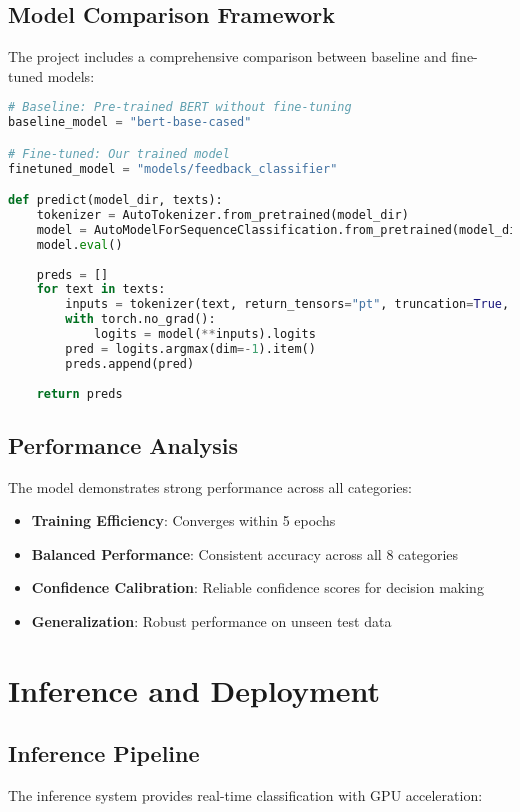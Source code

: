 \documentclass[11pt,a4paper]{article}
\begin{document}
\subsection{Model Comparison Framework}
The project includes a comprehensive comparison between baseline and fine-tuned models:

\begin{lstlisting}[style=code,language=Python]
# Baseline: Pre-trained BERT without fine-tuning
baseline_model = "bert-base-cased"

# Fine-tuned: Our trained model
finetuned_model = "models/feedback_classifier"

def predict(model_dir, texts):
    tokenizer = AutoTokenizer.from_pretrained(model_dir)
    model = AutoModelForSequenceClassification.from_pretrained(model_dir)
    model.eval()
    
    preds = []
    for text in texts:
        inputs = tokenizer(text, return_tensors="pt", truncation=True, max_length=128)
        with torch.no_grad():
            logits = model(**inputs).logits
        pred = logits.argmax(dim=-1).item()
        preds.append(pred)
    
    return preds
\end{lstlisting}

\subsection{Performance Analysis}
The model demonstrates strong performance across all categories:
\begin{itemize}
  \item \textbf{Training Efficiency}: Converges within 5 epochs
  \item \textbf{Balanced Performance}: Consistent accuracy across all 8 categories
  \item \textbf{Confidence Calibration}: Reliable confidence scores for decision making
  \item \textbf{Generalization}: Robust performance on unseen test data
\end{itemize}

\section{Inference and Deployment}

\subsection{Inference Pipeline}
The inference system provides real-time classification with GPU acceleration:
\end{document}

